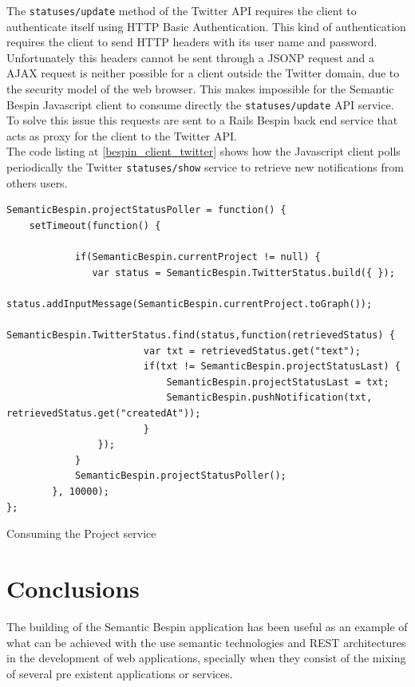 The \texttt{statuses/update} method of the Twitter API requires the client to authenticate itself using HTTP Basic
Authentication. This kind of authentication requires the client to send HTTP headers with its user name and
password. Unfortunately this headers cannot be sent through a JSONP request and a AJAX request is neither possible for
a client outside the Twitter domain, due to the security model of the web browser. This makes impossible for the
Semantic Bespin Javascript client to consume directly the \texttt{statuses/update} API service. To solve this issue this
requests are sent to a Rails Bespin back end service that acts as proxy for the client to the Twitter API.\\

The code listing at \ref{bespin_client_twitter} shows how the Javascript client polls periodically the Twitter
\texttt{statuses/show} service to retrieve new notifications from others users.


\begin{table}
\vspace{5 mm}
\begin{lstlisting}
SemanticBespin.projectStatusPoller = function() {
    setTimeout(function() {
            
            if(SemanticBespin.currentProject != null) {
               var status = SemanticBespin.TwitterStatus.build({ });
                status.addInputMessage(SemanticBespin.currentProject.toGraph());
                SemanticBespin.TwitterStatus.find(status,function(retrievedStatus) {
                        var txt = retrievedStatus.get("text");
                        if(txt != SemanticBespin.projectStatusLast) {
                            SemanticBespin.projectStatusLast = txt;
                            SemanticBespin.pushNotification(txt, retrievedStatus.get("createdAt"));
                        }
                });
            } 
            SemanticBespin.projectStatusPoller();            
        }, 10000);
};
\end{lstlisting} 
\vspace{5 mm}
\caption{Consuming the Project service}
\label{bespin_client_twitter}
\end{table}

\section{Conclusions}
The building of the Semantic Bespin application has been useful as an example of what can be achieved with the use
semantic technologies and REST architectures in the development of web applications, specially when they consist of the
mixing of several pre existent applications or services.\\

